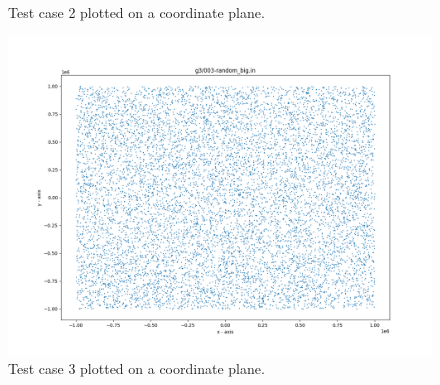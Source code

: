 \documentclass{article}
\begin{document}
\begin{appendices}
\begin{figure}[H]
	\caption{Test case 2 plotted on a coordinate plane.}
	\label{fig:02}
\end{figure}
\begin{figure}[H]
	\centering
	\includegraphics[scale=0.5]{code/visualizer/testdata/03.png}
	\caption{Test case 3 plotted on a coordinate plane.}
	\label{fig:03}
\end{figure}
\begin{figure}[H]
	\centering

\end{figure}
\end{appendices}
\end{document}
